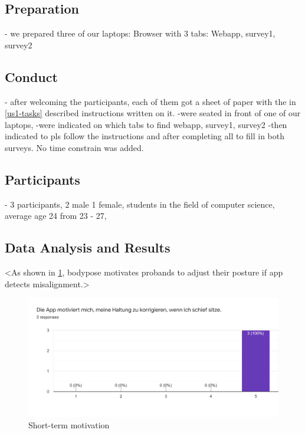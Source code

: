 \subsection{Preparation} %
- we prepared three of our laptops: Browser with 3 tabs: Webapp, survey1, survey2 

\subsection{Conduct} %
- after welcoming the participants, each of them got a sheet of paper with the in \ref{us1-tasks} described instructions written on it. -were seated in front of one of our laptops, -were indicated on which tabs to find webapp, survey1, survey2 -then indicated to pls follow the instructions and after completing all to fill in both surveys. No time constrain was added.  

\subsection{Participants} %
\label{us1-participants}
- 3 participants, 2 male 1 female, students in the field of computer science, average age 24 from 23 - 27,


\subsection{Data Analysis and Results} %
\label{us1-data-analysis-results}
<As shown in \ref{fig:us-gs-shortterm}, bodypose motivates probands to adjust their posture if app detects misalignment.> 

\begin{figure}[hbp]
\centering
\includegraphics[width=\linewidth]{media/us-gs-shortterm-motivation-results.png}    
\caption{Short-term motivation}
\label{fig:us-gs-shortterm}
\end{figure}

